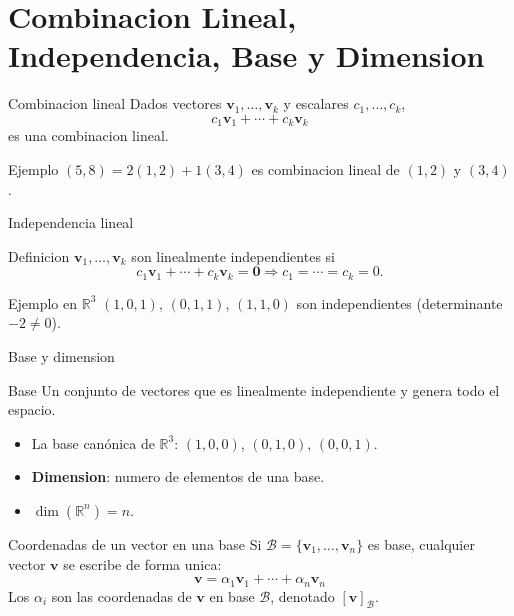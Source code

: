 \documentclass[aspectratio=169, 10pt, xcolor=table]{beamer}
\begin{document}
\section{Combinacion Lineal, Independencia, Base y Dimension}

\begin{frame}{Combinacion lineal}
    Dados vectores $\mathbf{v}_1,\dots,\mathbf{v}_k$ y escalares $c_1,\dots,c_k$,
    \[
    c_1\mathbf{v}_1 + \cdots + c_k\mathbf{v}_k
    \]
    es una combinacion lineal.
    \begin{exampleblock}{Ejemplo}
        $(5,8) = 2(1,2) + 1(3,4)$ es combinacion lineal de $(1,2)$ y $(3,4)$.
    \end{exampleblock}
\end{frame}

\begin{frame}{Independencia lineal}
    \begin{block}{Definicion}
        $\mathbf{v}_1,\dots,\mathbf{v}_k$ son linealmente independientes si
        \[
        c_1\mathbf{v}_1+\cdots+c_k\mathbf{v}_k = \mathbf{0} \Rightarrow c_1=\cdots=c_k=0.
        \]
    \end{block}
    \begin{exampleblock}{Ejemplo en $\mathbb{R}^3$}
        $(1,0,1)$, $(0,1,1)$, $(1,1,0)$ son independientes (determinante $-2\neq0$).
    \end{exampleblock}
\end{frame}

\begin{frame}{Base y dimension}
    \begin{block}{Base}
        Un conjunto de vectores que es linealmente independiente y genera todo el espacio.
    \end{block}
    \begin{itemize}
        \item La base canónica de $\mathbb{R}^3$: $(1,0,0)$, $(0,1,0)$, $(0,0,1)$.
        \item \textbf{Dimension}: numero de elementos de una base.
        \item $\dim(\mathbb{R}^n)=n$.
    \end{itemize}
\end{frame}

\begin{frame}{Coordenadas de un vector en una base}
    Si $\mathcal{B}=\{\mathbf{v}_1,\dots,\mathbf{v}_n\}$ es base, cualquier vector $\mathbf{v}$ se escribe de forma unica:
    \[
    \mathbf{v} = \alpha_1\mathbf{v}_1 + \cdots + \alpha_n\mathbf{v}_n
    \]
    Los $\alpha_i$ son las coordenadas de $\mathbf{v}$ en base $\mathcal{B}$, denotado $[\mathbf{v}]_{\mathcal{B}}$.
\end{frame}
\end{document}

